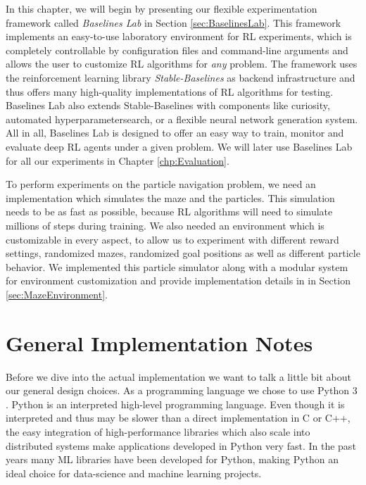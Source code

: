 In this chapter, we will begin by presenting our flexible experimentation framework called \textit{Baselines Lab} in Section \ref{sec:BaselinesLab}. This framework implements an easy-to-use laboratory environment for RL experiments, which is completely controllable by configuration files and command-line arguments and allows the user to customize RL algorithms for \textit{any} problem. The framework uses the reinforcement learning library \textit{Stable-Baselines} \cite{stable-baselines} as backend infrastructure and thus offers many high-quality implementations of RL algorithms for testing. Baselines Lab also extends Stable-Baselines with components like curiosity, automated hyperparametersearch, or a flexible neural network generation system. All in all, Baselines Lab is designed to offer an easy way to train, monitor and evaluate deep RL agents under a given problem. We will later use Baselines Lab for all our experiments in Chapter \ref{chp:Evaluation}. 

To perform experiments on the particle navigation problem, we need an implementation which simulates the maze and the particles. This simulation needs to be as fast as possible, because RL algorithms will need to simulate millions of steps during training. We also needed an environment which is customizable in every aspect, to allow us to experiment with different reward settings, randomized mazes, randomized goal positions as well as different particle behavior. We implemented this particle simulator along with a modular system for environment customization and provide implementation details in in Section \ref{sec:MazeEnvironment}. 

\section{General Implementation Notes} \label{sec:ImplementationNotes}
Before we dive into the actual implementation we want to talk a little bit about our general design choices. As a programming language we chose to use Python 3 \cite{van2011python, pythonWebsite}. Python is an interpreted high-level programming language. Even though it is interpreted and thus may be slower than a direct implementation in C or C++, the easy integration of high-performance libraries which also scale into distributed systems make applications developed in Python very fast. In the past years many ML libraries have been developed for Python, making Python an ideal choice for data-science and machine learning projects.

